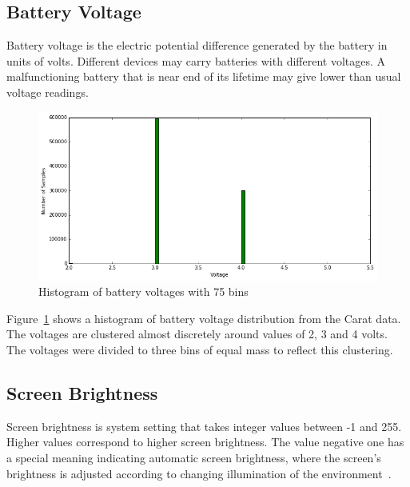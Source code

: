 \subsection{Battery Voltage}  

Battery voltage is the electric potential difference generated by the battery in units of volts. Different devices may carry batteries with different voltages. A malfunctioning battery that is near end of its lifetime may give lower than usual voltage readings.

\begin{figure} %
	\centering
	\includegraphics[width=\textwidth]{images/carat-data/battery_voltage.png}
	\caption{Histogram of battery voltages with 75 bins}
	\label{figure:carat-data-battery-voltage}
\end{figure}  

Figure~\ref{figure:carat-data-battery-voltage} shows a histogram of battery voltage distribution from the Carat data. The voltages are clustered almost discretely around values of 2, 3 and 4 volts. The voltages were divided to three bins of equal mass to reflect this clustering.    

\subsection{Screen Brightness} \label{carat data screen}

Screen brightness is system setting that takes integer values between -1 and 255. Higher values correspond to higher screen brightness. The value negative one has a special meaning indicating automatic screen brightness, where the screen's brightness is adjusted according to changing illumination of the environment~\cite{PELTONEN201671}.

